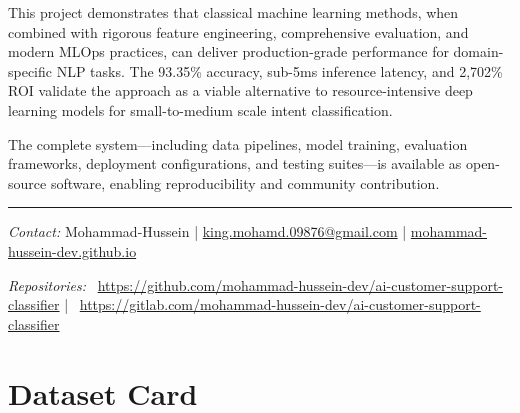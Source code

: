 \documentclass[12pt,a4paper]{article}
\begin{document}
This project demonstrates that classical machine learning methods, when combined with rigorous feature engineering, comprehensive evaluation, and modern MLOps practices, can deliver production-grade performance for domain-specific NLP tasks. The 93.35\% accuracy, sub-5ms inference latency, and 2,702\% ROI validate the approach as a viable alternative to resource-intensive deep learning models for small-to-medium scale intent classification.

The complete system---including data pipelines, model training, evaluation frameworks, deployment configurations, and testing suites---is available as open-source software, enabling reproducibility and community contribution.

\vspace{1cm}
\begin{center}
\textcolor{accentGold}{\rule{8cm}{1pt}}
\end{center}

\begin{bottomnote}
\textit{Contact:} Mohammad-Hussein | \href{mailto:king.mohamd.09876@gmail.com}{king.mohamd.09876@gmail.com} | \href{https://mohammad-hussein-dev.github.io}{mohammad-hussein-dev.github.io}

\textit{Repositories:} ~\url{https://github.com/mohammad-hussein-dev/ai-customer-support-classifier} | ~\url{https://gitlab.com/mohammad-hussein-dev/ai-customer-support-classifier}
\end{bottomnote}

\newpage

\appendix

\section{Dataset Card}
\label{app:dataset}
\end{document}
